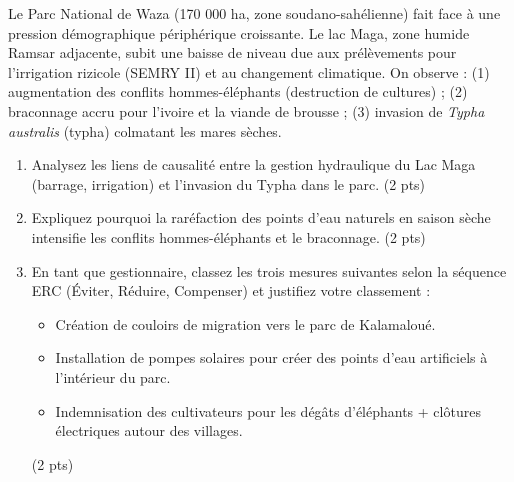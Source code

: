 \documentclass[11pt]{article}
\begin{document}
\begin{exercice}
\label{exo:waza}
Le Parc National de Waza (170 000 ha, zone soudano-sahélienne) fait face à une pression démographique périphérique croissante. Le lac Maga, zone humide Ramsar adjacente, subit une baisse de niveau due aux prélèvements pour l'irrigation rizicole (SEMRY II) et au changement climatique. On observe : (1) augmentation des conflits hommes-éléphants (destruction de cultures) ; (2) braconnage accru pour l'ivoire et la viande de brousse ; (3) invasion de \textit{Typha australis} (typha) colmatant les mares sèches.

\begin{enumerate}
    \item Analysez les liens de causalité entre la gestion hydraulique du Lac Maga (barrage, irrigation) et l'invasion du Typha dans le parc. (2 pts)
    \item Expliquez pourquoi la raréfaction des points d'eau naturels en saison sèche intensifie les conflits hommes-éléphants et le braconnage. (2 pts)
    \item En tant que gestionnaire, classez les trois mesures suivantes selon la séquence ERC (Éviter, Réduire, Compenser) et justifiez votre classement :
    \begin{itemize}
        \item[A.] Création de couloirs de migration vers le parc de Kalamaloué.
        \item[B.] Installation de pompes solaires pour créer des points d'eau artificiels à l'intérieur du parc.
        \item[C.] Indemnisation des cultivateurs pour les dégâts d'éléphants + clôtures électriques autour des villages.
    \end{itemize}
    (2 pts)
\end{enumerate}
\end{exercice}
\end{document}
